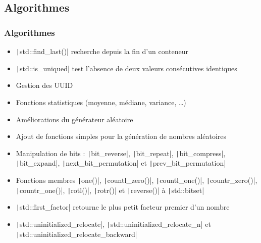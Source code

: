 \documentclass[C++.tex]{subfiles}
\begin{document}
\subsection*{Algorithmes}
\begin{frame}[fragile]
	\frametitle{Algorithmes}
	\begin{itemize}
		\item \texttt|std::find_last()| recherche depuis la fin d'un conteneur
		\item \texttt|std::is_uniqued| test l'absence de deux valeurs consécutives identiques
		\item Gestion des UUID
		\item Fonctions statistiques (moyenne, médiane, variance, \ldots{})
		\item Améliorations du générateur aléatoire
		\item Ajout de fonctions \og{}simples\fg{} pour la génération de nombres aléatoires
		\item Manipulation de bits : \texttt|bit_reverse|, \texttt|bit_repeat|, \texttt|bit_compress|, \texttt|bit_expand|, \texttt|next_bit_permutation| et \texttt|prev_bit_permutation|
		\item Fonctions membres \texttt|one()|, \texttt|countl_zero()|, \texttt|countl_one()|, \texttt|countr_zero()|, \texttt|countr_one()|, \texttt|rotl()|, \texttt|rotr()| et \texttt|reverse()| à \texttt|std::bitset|
		\item \texttt|std::first_factor| retourne le plus petit facteur premier d'un nombre
		\item \texttt|std::uninitialized_relocate|, \texttt|std::uninitialized_relocate_n| et  \texttt|std::uninitialized_relocate_backward|
	\end{itemize}

\end{frame}
\end{document}
